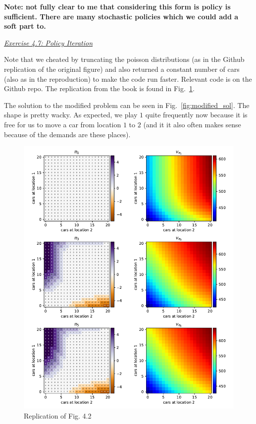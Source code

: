 \documentclass{article}
\newcommand{\myq}[1]{%
	\vspace{1em}
	\noindent\underline{\emph{Exercise #1}}\vspace{0.25em}\linebreak
}
\begin{document}
\textbf{Note: not fully clear to me that considering this form is policy is sufficient. There are many stochastic policies which we could add a soft part to.}

\myq{4.7: Policy Iteration}
Note that we cheated by truncating the poisson distributions (as in the Github replication of the original figure) and also returned a constant number of cars (also as in the reproduction) to make the code run faster. Relevant code is on the Github repo. The replication from the book is found in Fig.~\ref{fig:original_sol}.

The solution to the modified problem can be seen in Fig.~\ref{fig:modified_sol}. The shape is pretty wacky. As expected, we play $1$ quite frequently now because it is free for us to move a car from location $1$ to $2$ (and it it also often makes sense because of the demands are these places). 

\begin{figure}
	\includegraphics[width=\textwidth]{original}
	\centering
	\caption{\label{fig:original_sol} Replication of Fig. 4.2}
\end{figure}
\end{document}
